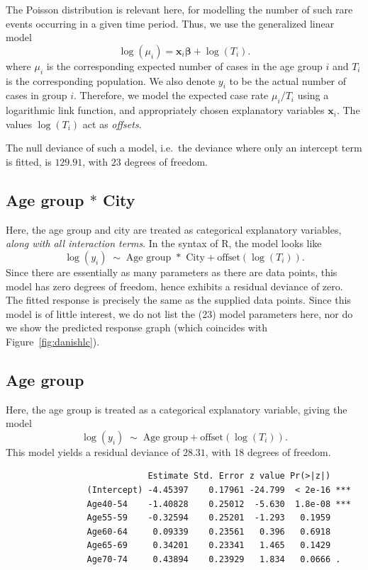 \documentclass[10pt]{article}
\begin{document}
    The Poisson distribution is relevant here, for modelling the number of such rare
    events occurring in a given time period. Thus, we use the generalized linear
    model \[
        \log(\mu_i) = \bm{x}_i\bm{\beta} + \log(T_i).
    \] where $\mu_i$ is the corresponding expected number of cases in the age group
    $i$ and $T_i$ is the corresponding population. We also denote $y_i$ to be the
    actual number of cases in group $i$. Therefore, we model the expected case rate
    $\mu_i / T_i$ using a logarithmic link function, and appropriately chosen
    explanatory variables $\bm{x}_i$. The values $\log(T_i)$ act as \emph{offsets}.

    The null deviance of such a model, i.e.\ the deviance where only an intercept
    term is fitted, is $129.91$, with $23$ degrees of freedom.


    \subsection{Age group $*$ City}

    Here, the age group and city are treated as categorical explanatory variables,
    \emph{along with all interaction terms}. In the syntax of R, the model looks like
    \[
        \log(y_i) \;\sim\; \text{Age group } * \text{ City}
        + \text{offset}(\log(T_i)). \tag{i}
    \] Since there are essentially as many parameters as there are data points, this
    model has zero degrees of freedom, hence exhibits a residual deviance of zero.
    The fitted response is precisely the same as the supplied data points. Since this
    model is of little interest, we do not list the (23) model parameters here, nor
    do we show the predicted response graph (which coincides with
    Figure~\ref{fig:danishlc}).


    \subsection{Age group}

    Here, the age group is treated as a categorical explanatory variable, giving the
    model \[
        \log(y_i) \;\sim\; \text{Age group}  + \text{offset}(\log(T_i)). \tag{ii}
    \] This model yields a residual deviance of $28.31$, with 18 degrees of freedom.

    \begin{verbatim}
                            Estimate Std. Error z value Pr(>|z|)    
                (Intercept) -4.45397    0.17961 -24.799  < 2e-16 ***
                Age40-54    -1.40828    0.25012  -5.630  1.8e-08 ***
                Age55-59    -0.32594    0.25201  -1.293   0.1959    
                Age60-64     0.09339    0.23561   0.396   0.6918    
                Age65-69     0.34201    0.23341   1.465   0.1429    
                Age70-74     0.43894    0.23929   1.834   0.0666 .  
    \end{verbatim}
\end{document}
